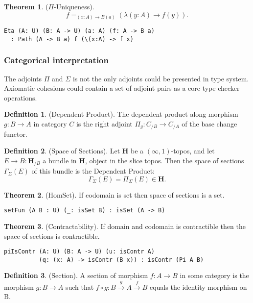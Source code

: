 \documentclass[twoside]{article}
\theoremstyle{definition}
\newtheorem{theorem}{Theorem}
\newtheorem{definition}{Definition}
\def\mapright#1{\xrightarrow{{#1}}}
\begin{document}
\begin{theorem} ($\Pi$-Uniqueness).
$$f =_{(x:A)\rightarrow B(a)} (\lambda (y:A) \rightarrow f(y)).$$
\begin{lstlisting}
Eta (A: U) (B: A -> U) (a: A) (f: A -> B a)
  : Path (A -> B a) f (\(x:A) -> f x)
\end{lstlisting}
\end{theorem}

\subsubsection*{Categorical interpretation}

The adjoints $\Pi$ and $\Sigma$ is not the only adjoints could be presented in type system.
Axiomatic cohesions could contain a set of adjoint pairs as a core type checker operations.

\begin{definition} (Dependent Product).
The dependent product along morphism $g: B \rightarrow A$ in category $C$ is the right
adjoint $\Pi_g : C_{/B} \rightarrow C_{/A}$ of the base change functor.
\end{definition}

\begin{definition} (Space of Sections).
Let $\mathbf{H}$ be a $(\infty,1)$-topos, and let $E \rightarrow B : \mathbf{H}_{/B}$ a bundle in
$\mathbf{H}$, object in the slice topos. Then the space of sections $\Gamma_\Sigma(E)$
of this bundle is the Dependent Product:
$$ \Gamma_\Sigma(E) = \Pi_\Sigma (E) \in \mathbf{H}. $$
\end{definition}

\begin{theorem} (HomSet).
If codomain is set then space of sections is a set.
\begin{lstlisting}
setFun (A B : U) (_: isSet B) : isSet (A -> B)
\end{lstlisting}
\end{theorem}

\begin{theorem} (Contractability).
If domain and codomain is contractible then the space of sections is contractible.
\begin{lstlisting}
piIsContr (A: U) (B: A -> U) (u: isContr A)
          (q: (x: A) -> isContr (B x)) : isContr (Pi A B)
\end{lstlisting}
\end{theorem}

\begin{definition} (Section).
A section of morphism $f: A \rightarrow B$ in some category is the morphism $g: B \rightarrow A$
such that $f \circ g: B \mapright{g} A \mapright{f} B$ equals the identity morphism on B.
\end{definition}
\end{document}
